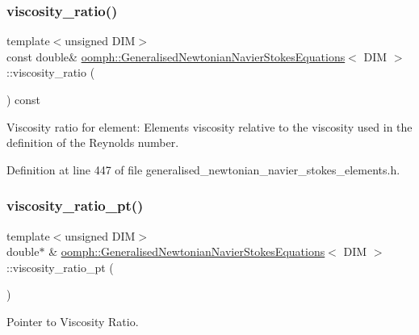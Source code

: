\subsubsection{\texorpdfstring{viscosity\+\_\+ratio()}{viscosity\_ratio()}}
{\footnotesize\ttfamily template$<$unsigned D\+IM$>$ \\
const double\& \hyperlink{classoomph_1_1GeneralisedNewtonianNavierStokesEquations}{oomph\+::\+Generalised\+Newtonian\+Navier\+Stokes\+Equations}$<$ D\+IM $>$\+::viscosity\+\_\+ratio (\begin{DoxyParamCaption}{ }\end{DoxyParamCaption}) const\hspace{0.3cm}{\ttfamily [inline]}}



Viscosity ratio for element\+: Element\textquotesingle{}s viscosity relative to the viscosity used in the definition of the Reynolds number. 



Definition at line 447 of file generalised\+\_\+newtonian\+\_\+navier\+\_\+stokes\+\_\+elements.\+h.

\mbox{\label{classoomph_1_1GeneralisedNewtonianNavierStokesEquations_aba98015b9092c3ac1d52170bac2733f8}} 
\subsubsection{\texorpdfstring{viscosity\+\_\+ratio\+\_\+pt()}{viscosity\_ratio\_pt()}}
{\footnotesize\ttfamily template$<$unsigned D\+IM$>$ \\
double$\ast$ \& \hyperlink{classoomph_1_1GeneralisedNewtonianNavierStokesEquations}{oomph\+::\+Generalised\+Newtonian\+Navier\+Stokes\+Equations}$<$ D\+IM $>$\+::viscosity\+\_\+ratio\+\_\+pt (\begin{DoxyParamCaption}{ }\end{DoxyParamCaption})\hspace{0.3cm}{\ttfamily [inline]}}



Pointer to Viscosity Ratio. 



